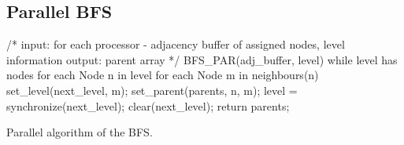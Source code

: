 \documentclass[12pt,a4paper]{article}
\begin{document}
\subsection{Parallel BFS}
\label{sec:parallel-bfs}

\begin{listing}[h]
\begin{ccode}
/*
input: for each processor - adjacency buffer of assigned nodes, level information
output: parent array
*/
BFS_PAR(adj_buffer, level){
	while level has nodes {
		for each Node n in level {
			for each Node m in neighbours(n){
				set_level(next_level, m);
				set_parent(parents, n, m); 
			}
		}
		level = synchronize(next_level);
		clear(next_level);
	}
	return parents;
}
\end{ccode}
\caption{Parallel algorithm of the BFS.}
\label{lst:parallel}
\end{listing}
\end{document}
